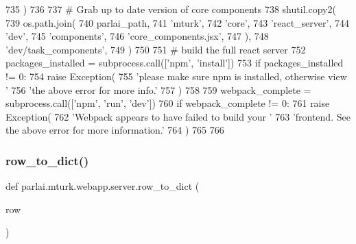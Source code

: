 \begin{DoxyCode}
735         )
736 
737     \textcolor{comment}{# Grab up to date version of core components}
738     shutil.copy2(
739         os.path.join(
740             parlai\_path,
741             \textcolor{stringliteral}{'mturk'},
742             \textcolor{stringliteral}{'core'},
743             \textcolor{stringliteral}{'react\_server'},
744             \textcolor{stringliteral}{'dev'},
745             \textcolor{stringliteral}{'components'},
746             \textcolor{stringliteral}{'core\_components.jsx'},
747         ),
748         \textcolor{stringliteral}{'dev/task\_components'},
749     )
750 
751     \textcolor{comment}{# build the full react server}
752     packages\_installed = subprocess.call([\textcolor{stringliteral}{'npm'}, \textcolor{stringliteral}{'install'}])
753     \textcolor{keywordflow}{if} packages\_installed != 0:
754         \textcolor{keywordflow}{raise} Exception(
755             \textcolor{stringliteral}{'please make sure npm is installed, otherwise view '}
756             \textcolor{stringliteral}{'the above error for more info.'}
757         )
758 
759     webpack\_complete = subprocess.call([\textcolor{stringliteral}{'npm'}, \textcolor{stringliteral}{'run'}, \textcolor{stringliteral}{'dev'}])
760     \textcolor{keywordflow}{if} webpack\_complete != 0:
761         \textcolor{keywordflow}{raise} Exception(
762             \textcolor{stringliteral}{'Webpack appears to have failed to build your '}
763             \textcolor{stringliteral}{'frontend. See the above error for more information.'}
764         )
765 
766 
\end{DoxyCode}
\mbox{\label{namespaceparlai_1_1mturk_1_1webapp_1_1server_a92be47964fa33a4b6a14d4069d091c7d}} 
\subsubsection{\texorpdfstring{row\+\_\+to\+\_\+dict()}{row\_to\_dict()}}
{\footnotesize\ttfamily def parlai.\+mturk.\+webapp.\+server.\+row\+\_\+to\+\_\+dict (\begin{DoxyParamCaption}\item[{}]{row }\end{DoxyParamCaption})}



